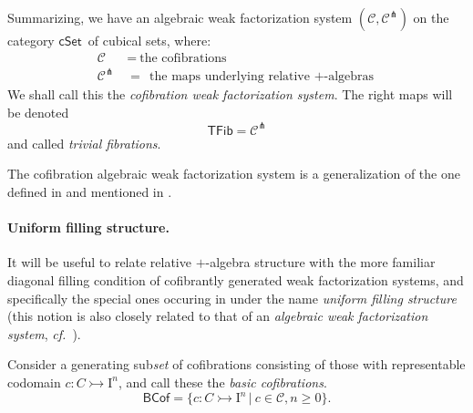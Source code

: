 \documentclass[11pt]{amsart}
\newcommand{\cf}{\emph{cf.}}
\newcommand{\cSet}{\ensuremath{\mathsf{cSet}}}
\newcommand{\mono}{\ensuremath{\rightarrowtail}}
\newcommand{\I}{\ensuremath{\mathrm{I}}}
\theoremstyle{remark}
\theoremstyle{definition}
\begin{document}
Summarizing, we have an algebraic weak factorization system $(\mathcal{C}, \mathcal{C}^\pitchfork)$ on the category \cSet\ of cubical sets, where:
\begin{align*}
\mathcal{C}\ &=\ \text{the cofibrations}\\
\mathcal{C}^\pitchfork\ &=\  \text{the maps underlying relative $+$-algebras}
\end{align*}
We shall call this the \emph{cofibration weak factorization system}. The right maps will be denoted
\[
\mathsf{TFib} = \mathcal{C}^\pitchfork
\]
and called \emph{trivial fibrations}.

The cofibration algebraic weak factorization system is a generalization of the one defined in \cite{BurkeGarner} and mentioned in \cite{GambinoSattler}.

\paragraph{Uniform filling structure.}

It will be useful to relate relative $+$-algebra structure with the more familiar diagonal filling condition of cofibrantly generated weak factorization systems, and specifically the special ones occuring in \cite{CCHM} under the name \emph{uniform filling structure} (this notion is also closely related to that of an \emph{algebraic weak factorization system}, \cf\ \cite{Garner,Riehl}).

Consider a generating sub\emph{set} of cofibrations consisting of those with representable codomain $c : C \mono \I^n$, and call these the \emph{basic cofibrations}.
\begin{equation}\label{eq:basiccof}
\mathsf{BCof} = \{c : C\mono \I^n\,|\ c\in \mathcal{C}, n\geq 0 \}.
\end{equation}
\end{document}
